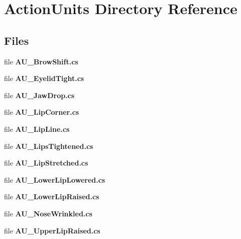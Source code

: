 \section{Action\+Units Directory Reference}
\label{dir_14b82473d56c424e3d371fe8814b51c4}
\subsection*{Files}
\begin{DoxyCompactItemize}
\item 
file \textbf{ A\+U\+\_\+\+Brow\+Shift.\+cs}
\item 
file \textbf{ A\+U\+\_\+\+Eyelid\+Tight.\+cs}
\item 
file \textbf{ A\+U\+\_\+\+Jaw\+Drop.\+cs}
\item 
file \textbf{ A\+U\+\_\+\+Lip\+Corner.\+cs}
\item 
file \textbf{ A\+U\+\_\+\+Lip\+Line.\+cs}
\item 
file \textbf{ A\+U\+\_\+\+Lips\+Tightened.\+cs}
\item 
file \textbf{ A\+U\+\_\+\+Lip\+Stretched.\+cs}
\item 
file \textbf{ A\+U\+\_\+\+Lower\+Lip\+Lowered.\+cs}
\item 
file \textbf{ A\+U\+\_\+\+Lower\+Lip\+Raised.\+cs}
\item 
file \textbf{ A\+U\+\_\+\+Nose\+Wrinkled.\+cs}
\item 
file \textbf{ A\+U\+\_\+\+Upper\+Lip\+Raised.\+cs}
\end{DoxyCompactItemize}
